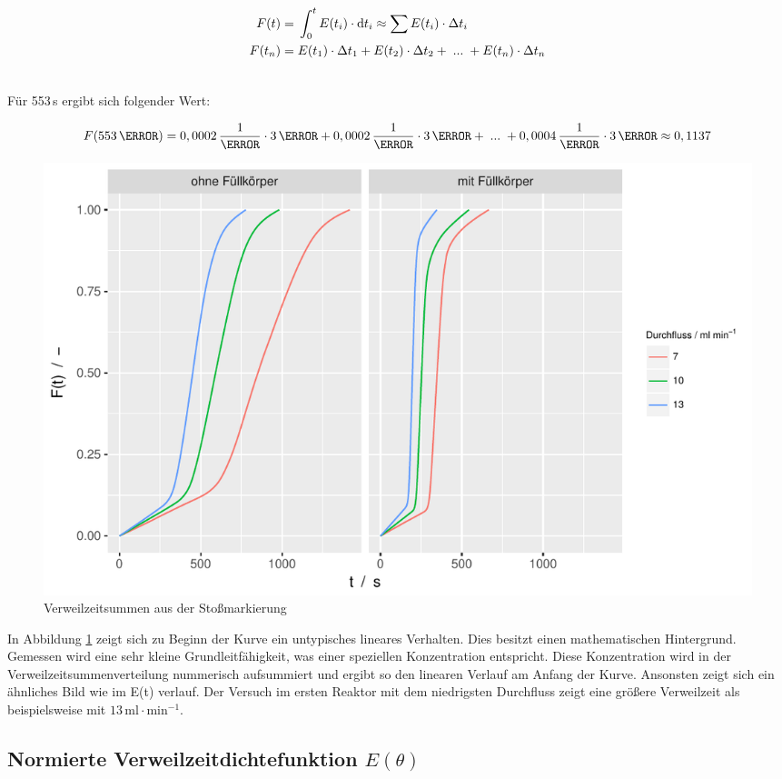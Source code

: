 \documentclass[12pt,liststotoc]{report}
\begin{document}
\begin{align}
F(t) =&\; \int_{0}^{t} E(t_i) \cdot \text{d} t_i \approx \sum E(t_i) \cdot \Delta t_i\\
F(t_n) =&\;E(t_1) \cdot \Delta t_1 + E(t_2) \cdot \Delta t_2+\;...\;+E(t_n) \cdot \Delta t_n\\\notag
\end{align}

Für 553\,s ergibt sich folgender Wert:

\begin{equation*}
F(553\,\s) =0,0002\,\frac{1}{\s}\cdot 3\,\s + 0,0002\,\frac{1}{\s}\cdot3\,\s+\;...\;+ 0,0004\,\frac{1}{\s} \cdot 3\,\s \approx 0,1137
\end{equation*} 

\begin{figure}[H]
\centering
\includegraphics[width=1\textwidth]{Graphics/F_stoss.pdf}
\caption[Verweilzeitsumme Stoßmarkierungen]{Verweilzeitsummen aus der Stoßmarkierung}
\label{summe_stoss}
\end{figure}
\noindent

In Abbildung \ref{summe_stoss} zeigt sich zu Beginn der Kurve ein untypisches lineares Verhalten. Dies besitzt einen mathematischen Hintergrund. Gemessen wird eine sehr kleine Grundleitfähigkeit, was einer speziellen Konzentration entspricht. Diese Konzentration wird in der Verweilzeitsummenverteilung nummerisch aufsummiert und ergibt so den linearen Verlauf am Anfang der Kurve. Ansonsten zeigt sich ein ähnliches Bild wie im E(t) verlauf. Der Versuch im ersten Reaktor mit dem niedrigsten Durchfluss zeigt eine größere Verweilzeit als beispielsweise mit $13\,\text{ml}\cdot\text{min}^{-1}$.

\subsection{Normierte Verweilzeitdichtefunktion $E(\theta)$}
\end{document}
